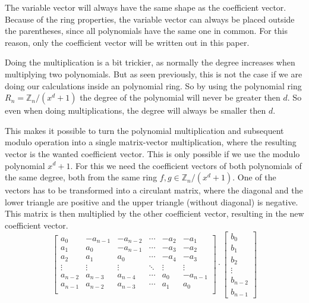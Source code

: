 The variable vector will always have the same shape as the coefficient vector. Because of the ring properties, the variable vector can always be placed outside the parentheses, since all polynomials have the same one in common. For this reason, only the coefficient vector will be written out in this paper.

Doing the multiplication is a bit trickier, as normally the degree increases when multiplying two polynomials. But as seen previously, this is not the case if we are doing our calculations inside an polynomial ring. So by using the polynomial ring $R_n = \mathbb{Z}_n/(x^d+1)$ the degree of the polynomial will never be greater then $d$. So even when doing multiplications, the degree will always be smaller then $d$.


This makes it possible to turn the polynomial multiplication and subsequent modulo operation into a single matrix-vector multiplication, where the resulting vector is the wanted coefficient vector. This is only possible if we use the modulo polynomial $x^d+1$. For this we need the coefficient vectors of both polynomials of the same degree, both from the same ring $f, g \in \mathbb{Z}_n/(x^d+1)$. One of the vectors has to be transformed into a circulant matrix, where the diagonal and the lower triangle are positive and the upper triangle (without diagonal) is negative. This matrix is then multiplied by the other coefficient vector, resulting in the new coefficient vector.
$$
  \begin{bmatrix}
    a_0     & -a_{n-1} & -a_{n-2} & \cdots & -a_2   & -a_1     \\
    a_1     & a_0      & -a_{n-1} & \cdots & -a_3   & -a_2     \\
    a_2     & a_1      & a_0      & \cdots & -a_4   & -a_3     \\
    \vdots  & \vdots   & \vdots   & \ddots & \vdots & \vdots   \\
    a_{n-2} & a_{n-3}  & a_{n-4}  & \cdots & a_0    & -a_{n-1} \\
    a_{n-1} & a_{n-2}  & a_{n-3}  & \cdots & a_1    & a_0      \\
  \end{bmatrix}
  \cdot
  \begin{bmatrix}
    b_0     \\
    b_1     \\
    b_2     \\
    \vdots  \\
    b_{n-2} \\
    b_{n-1}
  \end{bmatrix}
$$

